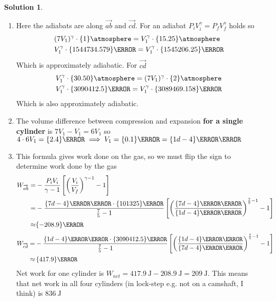 \documentclass[10pt]{article}
\theoremstyle{definition}
\newtheorem{soln}{Solution}
\begin{document}
\begin{soln} ~
  \begin{enumerate}[label=(\alph*)]
    \item Here the adiabats are along $\overrightarrow{ab}$ and $\overrightarrow{cd}$. For an adiabat $P_iV_i^\gamma=P_fV_f^\gamma$ holds so
          \begin{align*}
             & (7V_1)^\gamma\cdot\qty{1}{\atmosphere}=V_1^\gamma\cdot\qty{15.25}{\atmosphere}     \\
             & V_1^\gamma\cdot\qty{1544734.579}{\pascal}=V_1^\gamma\cdot\qty{1545206.25}{\pascal}
          \end{align*}
          Which is approximately adiabatic. For $\overrightarrow{cd}$
          \begin{align*}
             & V_1^\gamma\cdot\qty{30.50}{\atmosphere}=(7V_1)^\gamma\cdot\qty{2}{\atmosphere}    \\
             & V_1^\gamma\cdot\qty{3090412.5}{\pascal}=V_1^\gamma\cdot\qty{3089469.158}{\pascal}
          \end{align*}
          Which is also approximately adiabatic.
    \item The volume difference between compression and expansion \textbf{for a single cylinder} is $7V_1-V_1=6V_1$ so $4\cdot6V_1=\qty{2.4}{\liter}\implies V_1=\qty{0.1}{\liter}=\qty{1d-4}{\meter\cubed}$
    \item This formula gives work done on the gas, so we must flip the sign to determine work done by the gas
          \begin{align*}
            W_{\overrightarrow{ab}}= & -\frac{P_iV_i}{\gamma-1} \left[\left(\frac{V_i}{V_f}\right)^{\gamma-1}-1\right]                                                                                                 \\
            =                        & -\frac{\qty{7d-4}{\meter\cubed}\cdot\qty{101325}{\pascal}}{\frac{7}{5}-1} \left[\left(\frac{\qty{7d-4}{\meter\cubed}}{\qty{1d-4}{\meter\cubed}}\right)^{\frac{7}{5}-1}-1\right] \\
            \approx                  & \qty{-208.9}{\joule}
          \end{align*}
          \begin{align*}
            W_{\overrightarrow{cd}}= & -\frac{\qty{1d-4}{\meter\cubed}\cdot\qty{3090412.5}{\pascal}}{\frac{7}{5}-1} \left[\left(\frac{\qty{1d-4}{\meter\cubed}}{\qty{7d-4}{\meter\cubed}}\right)^{\frac{7}{5}-1}-1\right] \\
            \approx                  & \,\qty{417.9}{\joule}                                                                                                                                                              \\
          \end{align*}
          Net work for one cylinder is $W_{net}=\qty{417.9}{\joule}-\qty{208.9}{\joule}=\qty{209}{\joule}$. This means that net work in all four cylinders (in lock-step e.g. not on a camshaft, I think) is $\qty{836}{\joule}$
  \end{enumerate}
\end{soln}
\newpage
\end{document}
